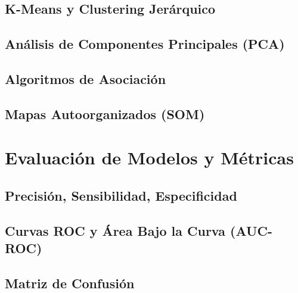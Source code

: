\documentclass[12pt]{article}
\begin{document}
\subsection{K-Means y Clustering Jerárquico}
\newpage
\subsection{Análisis de Componentes Principales (PCA)}
\newpage
\subsection{Algoritmos de Asociación}
\newpage
\subsection{Mapas Autoorganizados (SOM)}
\newpage
\section{Evaluación de Modelos y Métricas}
\newpage
\subsection{Precisión, Sensibilidad, Especificidad}
\newpage
\subsection{Curvas ROC y Área Bajo la Curva (AUC-ROC)}
\newpage
\subsection{Matriz de Confusión}
\newpage
\end{document}
